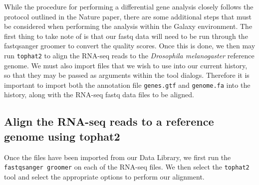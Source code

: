 \documentclass[a4paper,10pt]{article}
\begin{document}
While the procedure for performing a differential gene analysis closely follows the protocol outlined in the Nature paper, there are some additional steps that must be considered when performing the analysis within the Galaxy environment.  The first thing to take note of is that our fastq data will need to be run through the fastqsanger groomer to convert the quality scores.  Once this is done, we then may run \texttt{\footnotesize{tophat2}} to align the RNA-seq reads to the \textit{Drosophila melanogaster} reference genome.  We must also import files that we wish to use into our current history, so that they may be passed as arguments within the tool dialogs.  Therefore it is important to import both the annotation file \texttt{\footnotesize{genes.gtf}} and \texttt{\footnotesize{genome.fa}} into the history, along with the RNA-seq fastq data files to be aligned.

\subsection{Align the RNA-seq reads to a reference genome using tophat2}
Once the files have been imported from our Data Library, we first run the \texttt{\footnotesize{fastqsanger groomer}} on each of the RNA-seq files.  We then select the \texttt{\footnotesize{tophat2}} tool and select the appropriate options to perform our alignment.
\end{document}
